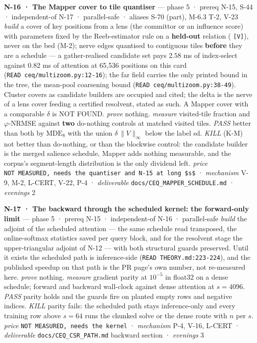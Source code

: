 \documentclass[11pt,a4paper]{article}
\theoremstyle{plain}
\theoremstyle{definition}
\theoremstyle{remark}
\begin{document}
\textbf{N-16 · The Mapper cover to tile quantiser} --- phase 5 · prereq
N-15, S-44 · independent-of N-17 · parallel-safe · aliases S-70 (part),
M-6.3 T-2, V-23 \emph{build} a cover of key positions from a lens (the
committor or an influence score) with parameters fixed by the
Reeb-estimator rule on a \textbf{held-out} relation
(\citep{carriere-2018-mapper-statistics} \texttt{{[}V{]}}), never on the
bed (M-2); nerve edges quantised to contiguous tiles \textbf{before}
they are a schedule --- a gather-realised candidate set pays \(2.58\) ms
of index-select against \(0.82\) ms of attention at 65,536 positions on
this card (\texttt{READ\ ceq/multizoom.py:12-16}); the far field carries
the only printed bound in the tree, the mean-pool coarsening bound
(\texttt{READ\ ceq/multizoom.py:38-49}). Cluster covers as candidate
builders are occupied and cited; the delta is the nerve of a lens cover
feeding a certified resolvent, stated as such. A Mapper cover with a
comparable \(\delta\) is NOT FOUND. \emph{prove} nothing. \emph{measure}
visited-tile fraction and \(\varphi\)-NRMSE against \textbf{two}
do-nothing controls at matched visited tiles. \emph{PASS} better than
both by \(\mathrm{MDE}_8\) with the union \(\delta\,\|V\|_\infty\) below
the label sd. \emph{KILL} (K-M) not better than do-nothing, or than the
blockwise control: the candidate builder is the merged salience
schedule, Mapper adds nothing measurable, and the corpus's
segment-length distribution is the only dividend left. \emph{price}
\texttt{NOT\ MEASURED,\ needs\ the\ quantiser\ and\ N-15\ at\ long\ \$s\$}
· \emph{mechanism} V-9, M-2, L-CERT, V-22, P-4 · \emph{deliverable}
\texttt{docs/CEQ\_MAPPER\_SCHEDULE.md} · \emph{evenings} 2

\textbf{N-17 · The backward through the scheduled kernel: the
forward-only limit} --- phase 5 · prereq N-15 · independent-of N-16 ·
parallel-safe \emph{build} the adjoint of the scheduled attention ---
the same schedule read transposed, the online-softmax statistics saved
per query block, and for the resolvent stage the upper-triangular
adjoint of N-12 --- with both structural guards preserved. Until it
exists the scheduled path is inference-side
(\texttt{READ\ THEORY.md:223-224}), and the published speedup on that
path is the PR page's own number, not re-measured here. \emph{prove}
nothing. \emph{measure} gradient parity at \(10^{-5}\) in float32 on a
dense schedule; forward and backward wall-clock against dense attention
at \(s=4096\). \emph{PASS} parity holds and the guards fire on planted
empty rows and negative indices. \emph{KILL} parity fails: the scheduled
path stays inference-only and every training row above \(s=64\) runs the
chunked solve or the dense route with \(n\) per \(s\). \emph{price}
\texttt{NOT\ MEASURED,\ needs\ the\ kernel} · \emph{mechanism} P-4,
V-16, L-CERT · \emph{deliverable} \texttt{docs/CEQ\_CSR\_PATH.md}
backward section · \emph{evenings} 3
\end{document}
